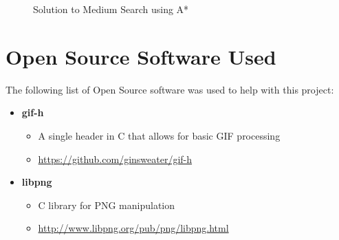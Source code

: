 \documentclass{article}[12pt]
\begin{document}
\begin{appendices}
   \begin{figure}[!htb]
   \centering
   \caption{Solution to Medium Search using A*}
   \label{fig:astar_ms_chull}
   \end{figure}
   
   \section{Open Source Software Used}
   The following list of Open Source software was used to help with this project:
   
   \begin{itemize}
   \item \textbf{gif-h}
   		\begin{itemize}
   		\item A single header in C that allows for basic GIF processing
   		\item \href{https://github.com/ginsweater/gif-h}{https://github.com/ginsweater/gif-h}
   		\end{itemize}
   \item \textbf{libpng}
   		\begin{itemize}
   		\item C library for PNG manipulation
   		\item \href{http://www.libpng.org/pub/png/libpng.html}{http://www.libpng.org/pub/png/libpng.html}
   		\end{itemize}
   \end{itemize}

\end{appendices}   
   
   
   
\end{document}
